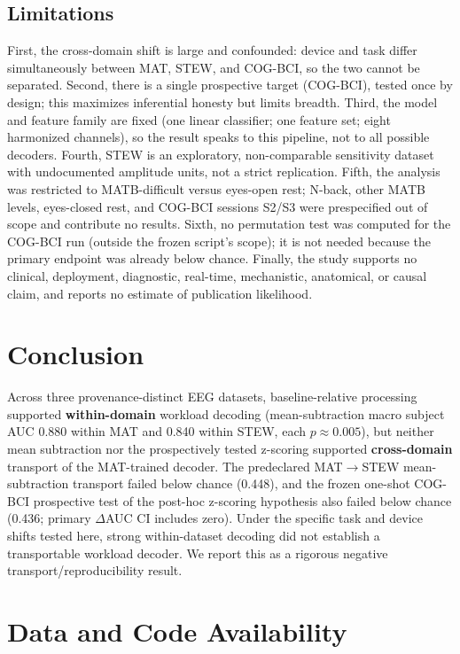 \documentclass[11pt]{article}
\begin{document}
\subsection{Limitations}

First, the cross-domain shift is large and confounded: device and task differ
simultaneously between MAT, STEW, and COG-BCI, so the two cannot be separated.
Second, there is a single prospective target (COG-BCI), tested once by design;
this maximizes inferential honesty but limits breadth. Third, the model and
feature family are fixed (one linear classifier; one feature set; eight
harmonized channels), so the result speaks to this pipeline, not to all possible
decoders. Fourth, STEW is an exploratory, non-comparable sensitivity dataset
with undocumented amplitude units, not a strict replication. Fifth, the analysis
was restricted to MATB-difficult versus eyes-open rest; N-back, other MATB
levels, eyes-closed rest, and COG-BCI sessions S2/S3 were prespecified out of
scope and contribute no results. Sixth, no permutation test was computed for the
COG-BCI run (outside the frozen script's scope); it is not needed because the
primary endpoint was already below chance. Finally, the study supports no
clinical, deployment, diagnostic, real-time, mechanistic, anatomical, or causal
claim, and reports no estimate of publication likelihood.

\section{Conclusion}

Across three provenance-distinct EEG datasets, baseline-relative processing
supported \textbf{within-domain} workload decoding (mean-subtraction macro
subject AUC 0.880 within MAT and 0.840 within STEW, each $p \approx 0.005$), but
neither mean subtraction nor the prospectively tested z-scoring supported
\textbf{cross-domain} transport of the MAT-trained decoder. The predeclared
MAT$\rightarrow$STEW mean-subtraction transport failed below chance (0.448), and
the frozen one-shot COG-BCI prospective test of the post-hoc z-scoring
hypothesis also failed below chance (0.436; primary $\Delta$AUC CI includes
zero). Under the specific task and device shifts tested here, strong
within-dataset decoding did not establish a transportable workload decoder. We
report this as a rigorous negative transport/reproducibility result.

\section{Data and Code Availability}
\end{document}
